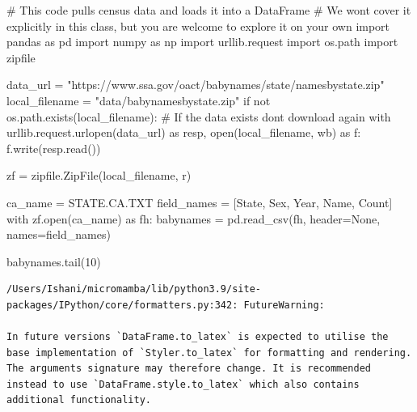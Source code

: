 \documentclass[
  letterpaper,
  DIV=11,
  numbers=noendperiod]{scrreprt}
\newenvironment{Shaded}{\begin{snugshade}}{\end{snugshade}}
\newcommand{\BuiltInTok}[1]{\textcolor[rgb]{0.00,0.23,0.31}{#1}}
\newcommand{\CommentTok}[1]{\textcolor[rgb]{0.37,0.37,0.37}{#1}}
\newcommand{\ControlFlowTok}[1]{\textcolor[rgb]{0.00,0.23,0.31}{#1}}
\newcommand{\DecValTok}[1]{\textcolor[rgb]{0.68,0.00,0.00}{#1}}
\newcommand{\ImportTok}[1]{\textcolor[rgb]{0.00,0.46,0.62}{#1}}
\newcommand{\KeywordTok}[1]{\textcolor[rgb]{0.00,0.23,0.31}{#1}}
\newcommand{\NormalTok}[1]{\textcolor[rgb]{0.00,0.23,0.31}{#1}}
\newcommand{\OperatorTok}[1]{\textcolor[rgb]{0.37,0.37,0.37}{#1}}
\newcommand{\StringTok}[1]{\textcolor[rgb]{0.13,0.47,0.30}{#1}}
\newcommand{\VariableTok}[1]{\textcolor[rgb]{0.07,0.07,0.07}{#1}}
\begin{document}
\begin{Shaded}
\begin{Highlighting}[]
\CommentTok{\# This code pulls census data and loads it into a DataFrame}
\CommentTok{\# We won\textquotesingle{}t cover it explicitly in this class, but you are welcome to explore it on your own}
\ImportTok{import}\NormalTok{ pandas }\ImportTok{as}\NormalTok{ pd}
\ImportTok{import}\NormalTok{ numpy }\ImportTok{as}\NormalTok{ np}
\ImportTok{import}\NormalTok{ urllib.request}
\ImportTok{import}\NormalTok{ os.path}
\ImportTok{import}\NormalTok{ zipfile}

\NormalTok{data\_url }\OperatorTok{=} \StringTok{"https://www.ssa.gov/oact/babynames/state/namesbystate.zip"}
\NormalTok{local\_filename }\OperatorTok{=} \StringTok{"data/babynamesbystate.zip"}
\ControlFlowTok{if} \KeywordTok{not}\NormalTok{ os.path.exists(local\_filename): }\CommentTok{\# If the data exists don\textquotesingle{}t download again}
    \ControlFlowTok{with}\NormalTok{ urllib.request.urlopen(data\_url) }\ImportTok{as}\NormalTok{ resp, }\BuiltInTok{open}\NormalTok{(local\_filename, }\StringTok{\textquotesingle{}wb\textquotesingle{}}\NormalTok{) }\ImportTok{as}\NormalTok{ f:}
\NormalTok{        f.write(resp.read())}

\NormalTok{zf }\OperatorTok{=}\NormalTok{ zipfile.ZipFile(local\_filename, }\StringTok{\textquotesingle{}r\textquotesingle{}}\NormalTok{)}

\NormalTok{ca\_name }\OperatorTok{=} \StringTok{\textquotesingle{}STATE.CA.TXT\textquotesingle{}}
\NormalTok{field\_names }\OperatorTok{=}\NormalTok{ [}\StringTok{\textquotesingle{}State\textquotesingle{}}\NormalTok{, }\StringTok{\textquotesingle{}Sex\textquotesingle{}}\NormalTok{, }\StringTok{\textquotesingle{}Year\textquotesingle{}}\NormalTok{, }\StringTok{\textquotesingle{}Name\textquotesingle{}}\NormalTok{, }\StringTok{\textquotesingle{}Count\textquotesingle{}}\NormalTok{]}
\ControlFlowTok{with}\NormalTok{ zf.}\BuiltInTok{open}\NormalTok{(ca\_name) }\ImportTok{as}\NormalTok{ fh:}
\NormalTok{    babynames }\OperatorTok{=}\NormalTok{ pd.read\_csv(fh, header}\OperatorTok{=}\VariableTok{None}\NormalTok{, names}\OperatorTok{=}\NormalTok{field\_names)}

\NormalTok{babynames.tail(}\DecValTok{10}\NormalTok{)}
\end{Highlighting}
\end{Shaded}

\begin{verbatim}
/Users/Ishani/micromamba/lib/python3.9/site-packages/IPython/core/formatters.py:342: FutureWarning:

In future versions `DataFrame.to_latex` is expected to utilise the base implementation of `Styler.to_latex` for formatting and rendering. The arguments signature may therefore change. It is recommended instead to use `DataFrame.style.to_latex` which also contains additional functionality.
\end{verbatim}
\end{document}
